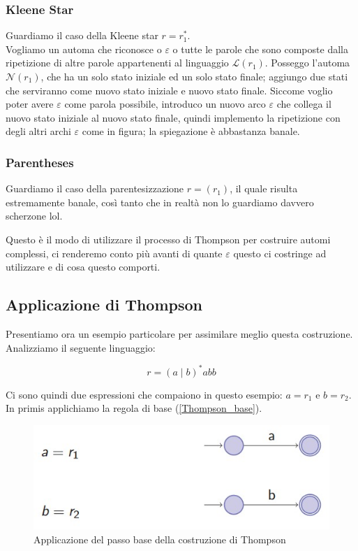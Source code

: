 \documentclass[class=book, crop=false, oneside, 12pt]{standalone}
\begin{document}
\subsubsection{Kleene Star}
Guardiamo il caso della Kleene star \(r = r_1^*\).\\
Vogliamo un automa che riconosce o \(\varepsilon\) o tutte le parole che sono composte dalla ripetizione di altre parole appartenenti al linguaggio \(\mathcal{L}(r_1)\).
Posseggo l’automa \(\mathcal{N}(r_1)\), che ha un solo stato iniziale ed un solo stato finale; aggiungo due stati che serviranno come nuovo stato iniziale e nuovo stato finale.
Siccome voglio poter avere \(\varepsilon\) come parola possibile, introduco un nuovo arco \(\varepsilon\) che collega il nuovo stato iniziale al nuovo stato finale, quindi implemento la ripetizione con degli altri archi \(\varepsilon\) come in figura; la spiegazione è abbastanza banale.

\subsubsection{Parentheses}
Guardiamo il caso della parentesizzazione \(r = ( r_1 )\), il quale risulta estremamente banale, così tanto che in realtà non lo guardiamo davvero scherzone lol.

Questo è il modo di utilizzare il processo di Thompson per costruire automi complessi, ci renderemo conto più avanti di quante \(\varepsilon\) questo ci costringe ad utilizzare e di cosa questo comporti.

\subsection{Applicazione di Thompson}
Presentiamo ora un esempio particolare per assimilare meglio questa costruzione. Analizziamo il seguente linguaggio:

\begin{equation}
    r = (a \mid b)^\ast abb
\end{equation}

\noindent Ci sono quindi due espressioni che compaiono in questo esempio: \(a = r_1\) e \(b = r_2\).
In primis applichiamo la regola di base (\ref{Thompson_base}).

\begin{figure}
    \centering
    \includegraphics[width=.7\textwidth,keepaspectratio]{esempio_Thompson_0}
    \caption{Applicazione del passo base della costruzione di Thompson}
    \label{esempio_Thompson_0}
\end{figure}
\end{document}
